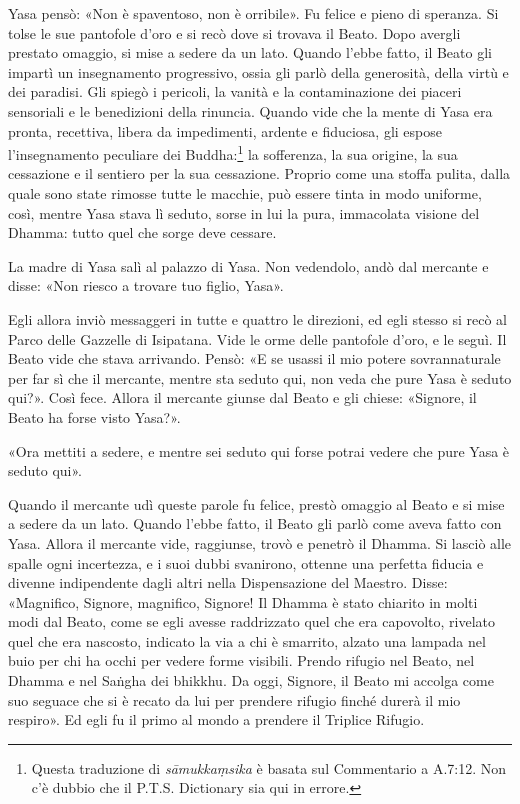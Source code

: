Yasa pensò: «Non è spaventoso, non è orribile». Fu felice e pieno di
speranza. Si tolse le sue pantofole d’oro e si recò dove si trovava il
Beato. Dopo avergli prestato omaggio, si mise a sedere da un lato.
Quando l’ebbe fatto, il Beato gli impartì un insegnamento progressivo,
ossia gli parlò della generosità, della virtù e dei paradisi. Gli spiegò
i pericoli, la vanità e la contaminazione dei piaceri sensoriali e le
benedizioni della rinuncia. Quando vide che la mente di Yasa era pronta,
recettiva, libera da impedimenti, ardente e fiduciosa, gli espose
l’insegnamento peculiare dei Buddha:\footnote{Questa traduzione di \emph{sāmukkaṃsika} è basata sul Commentario a A.7:12. Non c’è dubbio che il P.T.S. Dictionary sia qui in errore.} la sofferenza, la
sua origine, la sua cessazione e il sentiero per la sua cessazione.
Proprio come una stoffa pulita, dalla quale sono state rimosse tutte le
macchie, può essere tinta in modo uniforme, così, mentre Yasa stava lì
seduto, sorse in lui la pura, immacolata visione del Dhamma: tutto quel
che sorge deve cessare.


La madre di Yasa salì al palazzo di Yasa. Non vedendolo, andò dal
mercante e disse: «Non riesco a trovare tuo figlio, Yasa».


Egli allora inviò messaggeri in tutte e quattro le direzioni, ed egli
stesso si recò al Parco delle Gazzelle di Isipatana. Vide le orme delle
pantofole d’oro, e le seguì. Il Beato vide che stava arrivando. Pensò:
«E se usassi il mio potere sovrannaturale per far sì che il mercante,
mentre sta seduto qui, non veda che pure Yasa è seduto qui?». Così fece.
Allora il mercante giunse dal Beato e gli chiese: «Signore, il Beato ha
forse visto Yasa?».


«Ora mettiti a sedere, e mentre sei seduto qui forse potrai vedere che
pure Yasa è seduto qui».


Quando il mercante udì queste parole fu felice, prestò omaggio al Beato
e si mise a sedere da un lato. Quando l’ebbe fatto, il Beato gli parlò
come aveva fatto con Yasa. Allora il mercante vide, raggiunse, trovò e
penetrò il Dhamma. Si lasciò alle spalle ogni incertezza, e i suoi dubbi
svanirono, ottenne una perfetta fiducia e divenne indipendente dagli
altri nella Dispensazione del Maestro. Disse: «Magnifico, Signore,
magnifico, Signore! Il Dhamma è stato chiarito in molti modi dal Beato,
come se egli avesse raddrizzato quel che era capovolto, rivelato quel
che era nascosto, indicato la via a chi è smarrito, alzato una lampada
nel buio per chi ha occhi per vedere forme visibili. Prendo rifugio nel
Beato, nel Dhamma e nel Saṅgha dei bhikkhu. Da oggi, Signore, il Beato
mi accolga come suo seguace che si è recato da lui per prendere rifugio
finché durerà il mio respiro». Ed egli fu il primo al mondo a prendere
il Triplice Rifugio.


